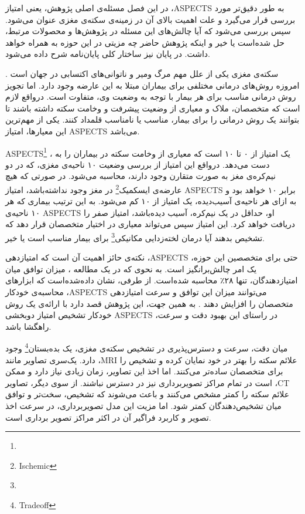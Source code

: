 

در این فصل مسئله‌ی اصلی پژوهش، یعنی امتیاز ،ASPECTS به طور دقیق‌تر مورد بررسی قرار می‌گیرد و علت اهمیت بالای آن در زمینه‌ی سکته‌ی مغزی عنوان می‌شود.
سپس بررسی می‌شود که آیا چالش‌های این مسئله در پژوهش‌ها و محصولات مرتبط، حل شده‌است یا خیر و اینکه پژوهش حاضر چه مزیتی در این حوزه به همراه خواهد داشت.
در پایان نیز ساختار کلی پایان‌نامه شرح داده می‌شود.


سکته‌ی مغزی یکی از علل مهم مرگ ومیر و ناتوانی‌های اکتسابی در جهان است \cite{donkor2018stroke}.
امروزه روش‌های درمانی مختلفی برای بیماران مبتلا به این عارضه وجود دارد.
اما تجویز روش درمانی مناسب برای هر بیمار با توجه به وضعیت وی، متفاوت است.
درواقع لازم است که متخصصان، ملاک و معیاری از وضعیت پیشرفت و وخامت سکته داشته باشند تا بتوانند یک روش درمانی را برای بیمار، مناسب یا نامناسب قلمداد کنند.
یکی از مهم‌ترین این معیارها، امتیاز ASPECTS می‌باشد.

ASPECTS\footnote{}
\cite{barber2000validity}،
یک امتیاز از ۰ تا ۱۰ است که معیاری از وخامت سکته در بیماران را به دست می‌دهد.
درواقع این امتیاز از بررسی وضعیت ۱۰ ناحیه‌ی مغزی، که در دو نیم‌کره‌ی مغز به صورت متقارن وجود دارند، محاسبه می‌شود.
در صورتی که هیچ عارضه‌ی ایسکمیک\footnote{Ischemic}
 در مغز وجود نداشته‌باشد، امتیاز ASPECTS برابر ۱۰ خواهد بود و به ازای هر ناحیه‌ی آسیب‌دیده، یک امتیاز از ۱۰ کم می‌شود.
به این ترتیب بیماری که هر ۱۰ ناحیه‌ی ASPECTS او، حداقل در یک نیم‌کره، آسیب دیده‌باشد، امتیاز صفر را دریافت خواهد کرد.
این امتیاز سپس می‌تواند معیاری در اختیار متخصصان قرار دهد که تشخیص بدهند آیا درمان 
لخته‌زدایی مکانیکی\footnote{}
برای بیمار مناسب است یا خیر.

نکته‌ی حائز اهمیت آن است که امتیازدهی ،ASPECTS حتی برای متخصصین این حوزه، یک امر چالش‌بر‌انگیز است.
به نحوی که در یک مطالعه \cite{van2021aspects}،
میزان توافق میان امتیازدهندگان، تنها ۲۸٪ محاسبه شده‌است.
از طرفی، نشان داده‌شده‌است که ابزار‌های محاسبه‌ی خودکار ،ASPECTS می‌توانند
میزان این توافق و سرعت امتیازدهی متخصصان را افزایش دهند \cite{chen2022improving}.
به همین جهت، این پژوهش قصد دارد با ارائه‌ی یک روش خودکار تشخیص امتیاز دوبخشی ASPECTS 
در راستای این بهبود دقت و سرعت، راهگشا باشد.

میان دقت، سرعت و دسترس‌پذیری در تشخیص سکته‌ی مغزی، یک 
بده‌بستان\footnote{Tradeoff}
وجود دارد.
یک‌سری تصاویر مانند ،MRI علائم سکته را بهتر در خود نمایان کرده و تشخیص را برای متخصصان ساده‌تر می‌کنند.
اما اخذ این تصاویر، زمان زیادی نیاز دارد و ممکن است در تمام مراکز تصویر‌برداری نیز در دسترس نباشند.
از سوی دیگر، تصاویر ،CT علائم سکته را کمتر مشخص می‌کنند و باعث می‌شوند که تشخیص، سخت‌تر و توافق میان تشخیص‌دهندگان کمتر شود.
اما مزیت این مدل تصویربرداری، در سرعت اخذ تصویر و کاربرد فراگیر آن در اکثر مراکز تصویر برداری است.

